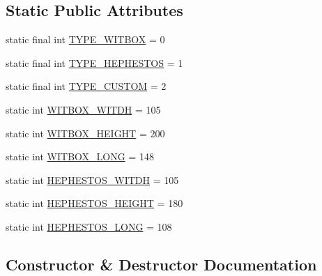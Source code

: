 \subsection*{Static Public Attributes}
\begin{DoxyCompactItemize}
\item 
static final int \hyperlink{classandroid_1_1app_1_1printerapp_1_1viewer_1_1_witbox_faces_a58c8ef5bdf1b11e3fbb01faec1348111}{T\+Y\+P\+E\+\_\+\+W\+I\+T\+B\+OX} = 0
\item 
static final int \hyperlink{classandroid_1_1app_1_1printerapp_1_1viewer_1_1_witbox_faces_aae7fa8a83c21767af2287fed2daeb730}{T\+Y\+P\+E\+\_\+\+H\+E\+P\+H\+E\+S\+T\+OS} = 1
\item 
static final int \hyperlink{classandroid_1_1app_1_1printerapp_1_1viewer_1_1_witbox_faces_a5f28fb25bdd2d845153669068f53128a}{T\+Y\+P\+E\+\_\+\+C\+U\+S\+T\+OM} = 2
\item 
static int \hyperlink{classandroid_1_1app_1_1printerapp_1_1viewer_1_1_witbox_faces_a8956262fee75903840ea76553bad4b1c}{W\+I\+T\+B\+O\+X\+\_\+\+W\+I\+T\+DH} = 105
\item 
static int \hyperlink{classandroid_1_1app_1_1printerapp_1_1viewer_1_1_witbox_faces_a7e207ad147a181b97cdaeb3736eb27f3}{W\+I\+T\+B\+O\+X\+\_\+\+H\+E\+I\+G\+HT} = 200
\item 
static int \hyperlink{classandroid_1_1app_1_1printerapp_1_1viewer_1_1_witbox_faces_a76256fd35c006c8802fa103767e6ab78}{W\+I\+T\+B\+O\+X\+\_\+\+L\+O\+NG} = 148
\item 
static int \hyperlink{classandroid_1_1app_1_1printerapp_1_1viewer_1_1_witbox_faces_a7c0d8938be5ed1a0efec2a67206e6e04}{H\+E\+P\+H\+E\+S\+T\+O\+S\+\_\+\+W\+I\+T\+DH} = 105
\item 
static int \hyperlink{classandroid_1_1app_1_1printerapp_1_1viewer_1_1_witbox_faces_a753410cd889f176a644a16e7603811a9}{H\+E\+P\+H\+E\+S\+T\+O\+S\+\_\+\+H\+E\+I\+G\+HT} = 180
\item 
static int \hyperlink{classandroid_1_1app_1_1printerapp_1_1viewer_1_1_witbox_faces_a3890f9d0cfe31f1e3a95855768c538b3}{H\+E\+P\+H\+E\+S\+T\+O\+S\+\_\+\+L\+O\+NG} = 108
\end{DoxyCompactItemize}


\subsection{Constructor \& Destructor Documentation}
\mbox{\label{classandroid_1_1app_1_1printerapp_1_1viewer_1_1_witbox_faces_af3636919042bba77eff697271eb564fb}} 
